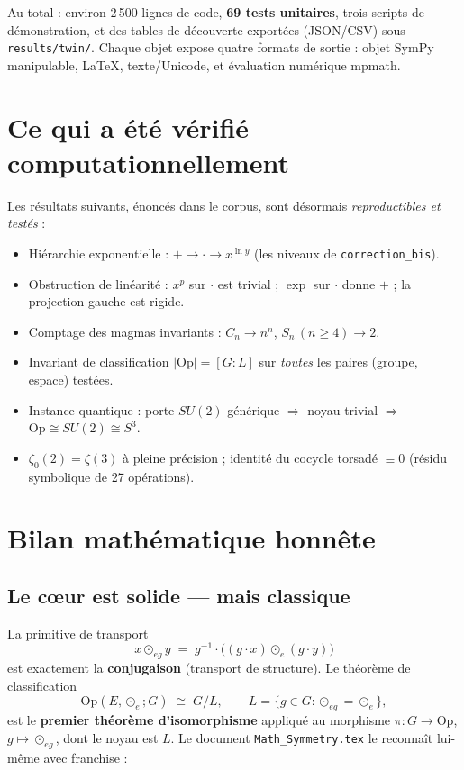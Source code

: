 \documentclass[11pt,a4paper]{article}
\newcommand{\Op}{\mathrm{Op}}
\newcommand{\code}[1]{\texttt{#1}}
\theoremstyle{definition}
\begin{document}
\noindent
Au total : environ 2\,500 lignes de code, \textbf{69 tests unitaires}, trois
scripts de démonstration, et des tables de découverte exportées (JSON/CSV)
sous \code{results/twin/}. Chaque objet expose quatre formats de sortie :
objet SymPy manipulable, \LaTeX, texte/Unicode, et évaluation numérique mpmath.

\section{Ce qui a été vérifié computationnellement}

Les résultats suivants, énoncés dans le corpus, sont désormais
\emph{reproductibles et testés} :

\begin{itemize}
  \item Hiérarchie exponentielle : $+ \to \cdot \to x^{\ln y}$ (les niveaux de
        \code{correction\_bis}).
  \item Obstruction de linéarité : $x^p$ sur $\cdot$ est trivial ; $\exp$ sur
        $\cdot$ donne $+$ ; la projection gauche est rigide.
  \item Comptage des magmas invariants : $C_n \to n^n$, $S_n\,(n\ge 4) \to 2$.
  \item Invariant de classification $|\Op| = [G:L]$ sur \emph{toutes} les paires
        (groupe, espace) testées.
  \item Instance quantique : porte $SU(2)$ générique $\Rightarrow$ noyau trivial
        $\Rightarrow$ $\Op \cong SU(2) \cong S^3$.
  \item $\zeta_0(2) = \zeta(3)$ à pleine précision ; identité du cocycle torsadé
        $\equiv 0$ (résidu symbolique de 27 opérations).
\end{itemize}

\section{Bilan mathématique honnête}

\subsection{Le c\oe ur est solide --- mais classique}

La primitive de transport
\[
x \odot_{eg} y \;=\; g^{-1}\cdot\big((g\cdot x)\odot_e(g\cdot y)\big)
\]
est exactement la \textbf{conjugaison} (transport de structure). Le théorème de
classification
\[
\Op(E,\odot_e;G) \;\cong\; G/L, \qquad
L = \{g\in G : \odot_{eg}=\odot_e\},
\]
est le \textbf{premier théorème d'isomorphisme} appliqué au morphisme
$\pi : G \to \Op$, $g \mapsto \odot_{eg}$, dont le noyau est $L$. Le document
\code{Math\_Symmetry.tex} le reconnaît lui-même avec franchise :
\end{document}
